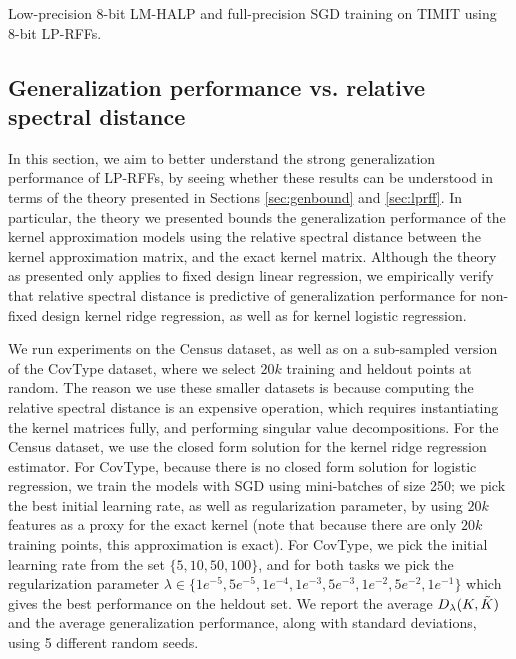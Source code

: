 \begin{table}[ht]
\begin{minipage}{0.375\linewidth}
	\caption{Low-precision 8-bit LM-HALP and full-precision SGD training on TIMIT using 8-bit LP-RFFs.}	
	\label{fig:halp}
\end{minipage}
\end{table}

\vsp
\subsection{Generalization performance vs. relative spectral distance}
\label{subsec:perf_vs_rel_spec_dist}
In this section, we aim to better understand the strong generalization performance of LP-RFFs, by seeing whether these results can be understood in terms of the theory presented in Sections \ref{sec:genbound} and \ref{sec:lprff}.  In particular, the theory we presented bounds the generalization performance of the kernel approximation models using the relative spectral distance between the kernel approximation matrix, and the exact kernel matrix.  Although the theory as presented only applies to fixed design linear regression, we empirically verify that relative spectral distance is predictive of generalization performance for non-fixed design kernel ridge regression, as well as for kernel logistic regression.

We run experiments on the Census dataset, as well as on a sub-sampled version of the CovType dataset, where we select $20k$ training and heldout points at random.  The reason we use these smaller datasets is because computing the relative spectral distance is an expensive operation, which requires instantiating the kernel matrices fully, and performing singular value decompositions. For the Census dataset, we use the closed form solution for the kernel ridge regression estimator.  For CovType, because there is no closed form solution for logistic regression, we train the models with SGD using mini-batches of size 250; we pick the best initial learning rate, as well as regularization parameter, by using $20k$ \Nystrom features as a proxy for the exact kernel (note that because there are only $20k$ training points, this \Nystrom approximation is exact). For CovType, we pick the initial learning rate from the set $\{5, 10, 50, 100\}$, and for both tasks we pick the regularization parameter $\lambda \in \{1e^{-5}, 5e^{-5}, 1e^{-4}, 1e^{-3}, 5e^{-3}, 1e^{-2}, 5e^{-2}, 1e^{-1}\}$ which gives the best performance on the heldout set. We report the average $D_{\lambda}(K,\tilde{K})$ and the average generalization performance, along with standard deviations, using 5 different random seeds.

